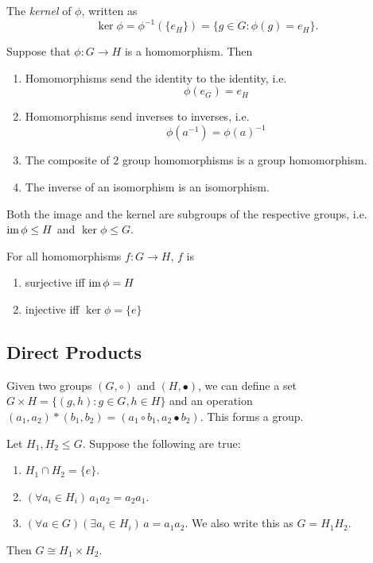 \documentclass[11pt]{scrartcl}
\begin{document}
\begin{definitions}
  The \emph{kernel} of $\phi$, written as
  \[
    \ker \phi = \phi^{-1}(\{e_H\}) = \{g\in G:\phi(g)=e_H\}.
  \]
\end{definitions}

\begin{prop}
  Suppose that $\phi: G\rightarrow H$ is a homomorphism. Then
  \begin{enumerate}
    \item Homomorphisms send the identity to the identity, i.e.
      \[
        \phi(e_G) = e_H
      \]
    \item Homomorphisms send inverses to inverses, i.e.
      \[
        \phi(a^{-1}) = \phi(a)^{-1}
      \]
    \item The composite of 2 group homomorphisms is a group homomorphism.
    \item The inverse of an isomorphism is an isomorphism.
  \end{enumerate}
\end{prop}
\begin{prop}
  Both the image and the kernel are subgroups of the respective groups, i.e.\ $\operatorname{im} \phi\leq H$ and $\ker \phi \leq G$.
\end{prop}
\begin{prop}
  For all homomorphisms $f:G\rightarrow H$, $f$ is
  \begin{enumerate}
    \item surjective iff $\operatorname{im} \phi = H$
    \item injective iff $\ker \phi = \{e\}$
  \end{enumerate}
\end{prop}
\subsection{Direct Products}
\begin{definitions}
  Given two groups $(G, \circ)$ and $(H, \bullet)$, we can define a set $G\times H = \{(g, h): g\in G, h\in H\}$ and an operation $(a_1, a_2)*(b_1, b_2) = (a_1\circ b_1, a_2\bullet b_2)$. This forms a group.
\end{definitions}

\begin{theorem}
  Let $H_1, H_2\leq G$. Suppose the following are true:
  \begin{enumerate}
    \item $H_1\cap H_2 = \{e\}$.
    \item $(\forall a_i\in H_i)\, a_1a_2=a_2a_1$.
    \item $(\forall a\in G)(\exists a_i\in H_i)\,a = a_1a_2$. We also write this as $G=H_1H_2$.
  \end{enumerate}
  Then $G\cong H_1\times H_2$.
\end{theorem}
\end{document}
